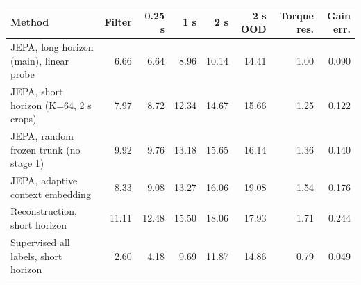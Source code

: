 \begin{tabular}{lrrrrrrr}
\toprule
Method & Filter & 0.25 s & 1 s & 2 s & 2 s OOD & Torque res. & Gain err.\\
\midrule
JEPA, long horizon (main), linear probe & 6.66 & 6.64 & 8.96 & 10.14 & 14.41 & 1.00 & 0.090\\
JEPA, short horizon (K=64, 2 s crops) & 7.97 & 8.72 & 12.34 & 14.67 & 15.66 & 1.25 & 0.122\\
JEPA, random frozen trunk (no stage 1) & 9.92 & 9.76 & 13.18 & 15.65 & 16.14 & 1.36 & 0.140\\
JEPA, adaptive context embedding & 8.33 & 9.08 & 13.27 & 16.06 & 19.08 & 1.54 & 0.176\\
Reconstruction, short horizon & 11.11 & 12.48 & 15.50 & 18.06 & 17.93 & 1.71 & 0.244\\
Supervised all labels, short horizon & 2.60 & 4.18 & 9.69 & 11.87 & 14.86 & 0.79 & 0.049\\
\bottomrule
\end{tabular}